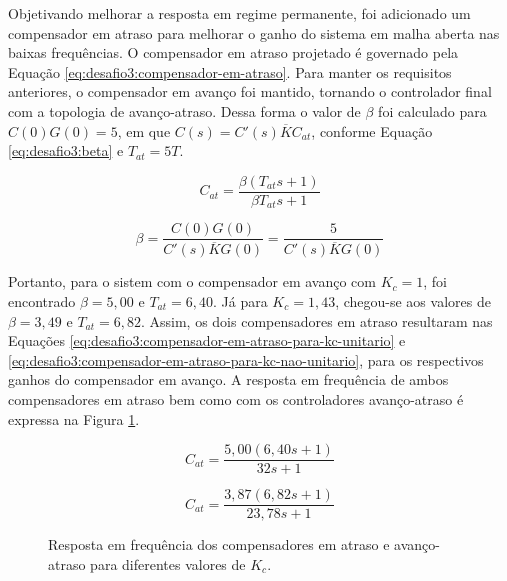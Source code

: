 Objetivando melhorar a resposta em regime permanente, foi adicionado um
compensador em atraso para melhorar o ganho do sistema em malha aberta nas
baixas frequências. O compensador em atraso projetado é governado pela Equação
\ref{eq:desafio3:compensador-em-atraso}. Para manter os requisitos anteriores, o
compensador em avanço foi mantido, tornando o controlador final com a topologia
de avanço-atraso. Dessa forma o valor de $\beta$ foi calculado para $C(0)G(0) =
5$, em que $C(s) = C'(s)\overline{K}C_{at}$, conforme Equação
\ref{eq:desafio3:beta} e $T_{at} = 5T$.

\begin{equation}
    \label{eq:desafio3:compensador-em-atraso}
    C_{at} = \frac{\beta (T_{at}s + 1)}{\beta T_{at}s+1}
\end{equation}

\begin{equation}
    \label{eq:desafio3:beta}
    \beta = \frac{C(0)G(0)}{C'(s)\overline{K}G(0)} = \frac{5}{C'(s)\overline{K}G(0)}
\end{equation}

Portanto, para o sistem com o compensador em avanço com $K_c = 1$, foi
encontrado $\beta = 5,00$ e $T_{at} = 6,40$. Já para $K_c = 1,43$, chegou-se aos
valores de $\beta = 3,49$ e $T_{at} = 6,82$. Assim, os dois compensadores em
atraso resultaram nas Equações
\ref{eq:desafio3:compensador-em-atraso-para-kc-unitario} e
\ref{eq:desafio3:compensador-em-atraso-para-kc-nao-unitario}, para os respectivos
ganhos do compensador em avanço. A resposta em frequência de ambos
compensadores em atraso bem como com os controladores avanço-atraso é expressa na
Figura \ref{fig:desafio-3:resposta-em-frequencia-dos-compensadores}.

\begin{equation}
    \label{eq:desafio3:compensador-em-atraso-para-kc-unitario}
    C_{at} = \frac{5,00 (6,40s + 1)}{32s+1}
\end{equation}

\begin{equation}
    \label{eq:desafio3:compensador-em-atraso-para-kc-nao-unitario}
    C_{at} = \frac{3,87 (6,82s + 1)}{23,78s+1}
\end{equation}

\begin{figure}[ht!]
    \caption{Resposta em frequência dos compensadores em atraso e avanço-atraso
    para diferentes valores de $K_c$.}
    \vspace{-10pt}
    \hspace{-30pt}
    \label{fig:desafio-3:resposta-em-frequencia-dos-compensadores}
    \begin{minipage}{\linewidth}
        
    \end{minipage}
\end{figure}

